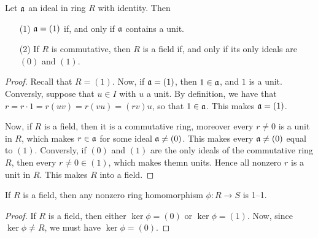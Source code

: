 \begin{proposition}\label{proposition_5.4.1}
  Let $\mathfrak{a}$ an ideal in ring $R$ with identity. Then
  \begin{enumerate}
    \item[(1)] $\mathfrak{a}=(1)$ if, and only if $\mathfrak{a}$ contains a unit.

    \item[(2)] If $R$ is commutative, then $R$ is a field if, and only if
      its only ideals are $(0)$ and $(1)$.
  \end{enumerate}
\end{proposition}
\begin{proof}
  Recall that $R=(1)$. Now, if $\mathfrak{a}=(1)$, then $1 \in \mathfrak{a}$, and  $1$ is a unit.
  Conversly, suppose that $u \in I$ with $u$ a unit. By definition, we have
  that  $r=r \cdot 1=r(uv)=r(vu)=(rv)u$, so that $1 \in \mathfrak{a}$. This makes
  $\mathfrak{a}=(1)$.

  Now, if $R$ is a field, then it is a commutative ring, moreover every  $r
  \neq 0$ is a unit in $R$, which makes $r \in \mathfrak{a}$ for some ideal
  $\mathfrak{a} \neq (0)$. This makes every $\mathfrak{a} \neq (0)$ equal to $(1)$. Conversly,
  if $(0)$ and $(1)$ are the only ideals of the commutative ring $R$, then
  every $r \neq 0 \in (1)$, which makes themn units. Hence all nonzero $r$ is a
  unit in $R$. This makes $R$ into a field.
\end{proof}
\begin{corollary}
  If $R$ is a field, then any nonzero ring homomorphism $\phi:R \xrightarrow{}
  S$ is 1--1.
\end{corollary}
\begin{proof}
  If $R$ is a field, then either $\ker{\phi}=(0)$ or $\ker{\phi}=(1)$. Now,
  since $\ker{\phi} \neq R$, we must have $\ker{\phi}=(0)$.
\end{proof}

